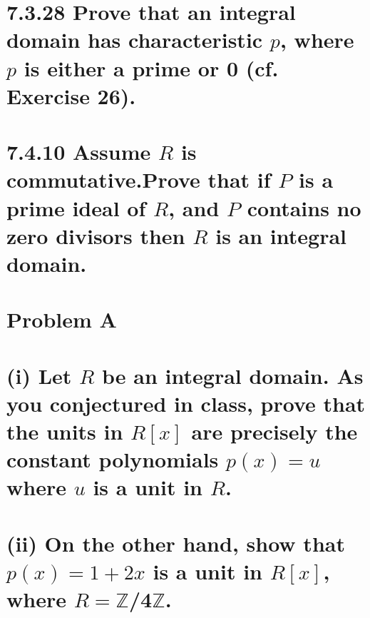 \documentclass{article}
\begin{document}
{\section*{\hspace{-1.63cm}7.3.28\Large{} \normalfont Prove that an integral domain has characteristic $p$, where $p$ is either a prime or 0 (cf. Exercise 26).}
\newpage
\section*{\hspace{-1.75cm}7.4.10\Large{} \normalfont Assume $R$ is commutative.\hspace{0.15cm}Prove that if $P$ is a prime ideal of $R$, and $P$ contains no zero divisors then $R$ is an integral domain.}
\newpage
\section*{\hspace{-1cm}Problem A\Large{} \normalfont 
\\
\\ (i) Let $R$ be an integral domain. As you conjectured in class, prove that the units in $R[x]$ are precisely the constant polynomials $p(x)=u$ where $u$ is a unit in $R$.
\\
\\ (ii) On the other hand, show that $p(x)=1+2x$ is a unit in $R[x]$, where $R=\mathbb{Z}$/4$\mathbb{Z}$.}}
\end{document}
